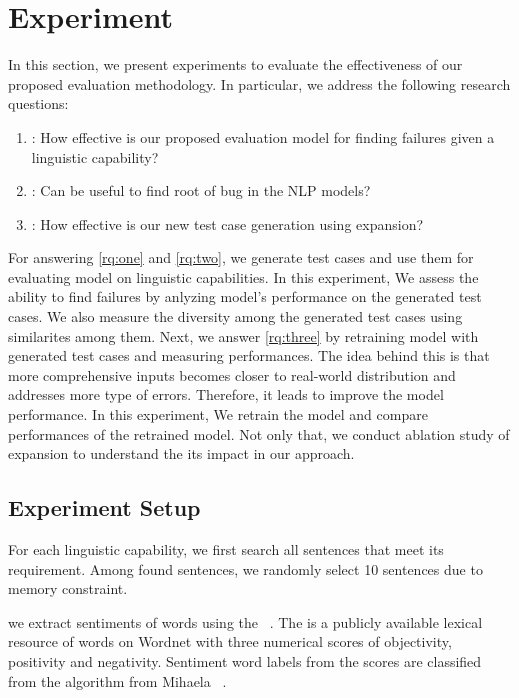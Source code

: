 \section{Experiment}
\label{sec:experiment}
%


In this section, we present experiments to evaluate the effectiveness
of our proposed evaluation methodology. In particular, we address the
following research questions:

\begin{enumerate}[label=\textbf{RQ\arabic*}]
\item \label{rq:one}: How effective is our proposed evaluation model
  for finding failures given a linguistic capability?
\item \label{rq:two}: Can \tool be useful to find root of bug in the
  NLP models?
\item \label{rq:three}: How effective is our new test case generation
  using \cfg expansion? %
\end{enumerate}

For answering \ref{rq:one} and \ref{rq:two}, we generate test cases
and use them for evaluating model on linguistic capabilities. In this
experiment, We assess the ability to find failures by anlyzing model's
performance on the generated test cases. We also measure the diversity
among the generated test cases using similarites among them. Next, we
answer \ref{rq:three} by retraining \sa model with generated test
cases and measuring performances. The idea behind this is that more
comprehensive inputs becomes closer to real-world distribution and
addresses more type of errors.  Therefore, it leads to improve the
model performance. In this experiment, We retrain the model and
compare performances of the retrained model. Not only that, we conduct
ablation study of \cfg expansion to understand the its impact in our
approach.

\subsection{Experiment Setup}
%
%
For each linguistic capability, we first search all sentences that
meet its requirement. Among found sentences, we randomly select 10
sentences due to memory constraint.

%
we extract sentiments of words using the
\Swn~\cite{baccianella2010sentiwordnet}. The \Swn is a publicly
available lexical resource of words on Wordnet with three numerical
scores of objectivity, positivity and negativity. Sentiment word
labels from the scores are classified from the algorithm from Mihaela
\etal~\cite{mihaela2017sentiwordnetlabel}.

